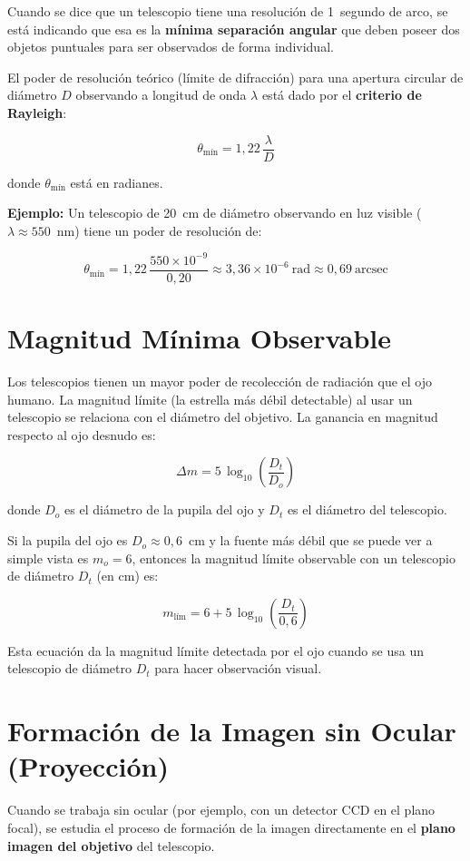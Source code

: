Cuando se dice que un telescopio tiene una resolución de 1~segundo de arco, se está indicando que esa es la \textbf{mínima separación angular} que deben poseer dos objetos puntuales para ser observados de forma individual.

El poder de resolución teórico (límite de difracción) para una apertura circular de diámetro $D$ observando a longitud de onda $\lambda$ está dado por el \textbf{criterio de Rayleigh}:

$$\theta_{\text{mín}} = 1{,}22\,\frac{\lambda}{D}$$

donde $\theta_{\text{mín}}$ está en radianes.

\textbf{Ejemplo:} Un telescopio de 20~cm de diámetro observando en luz visible ($\lambda \approx 550$~nm) tiene un poder de resolución de:

$$\theta_{\text{mín}} = 1{,}22\,\frac{550\times10^{-9}}{0{,}20} \approx 3{,}36\times10^{-6}~\text{rad} \approx 0{,}69~\text{arcsec}$$

\section{Magnitud Mínima Observable}

Los telescopios tienen un mayor poder de recolección de radiación que el ojo humano. La magnitud límite (la estrella más débil detectable) al usar un telescopio se relaciona con el diámetro del objetivo. La ganancia en magnitud respecto al ojo desnudo es:

$$\Delta m = 5\,\log_{10}\!\left(\frac{D_t}{D_o}\right)$$

donde $D_o$ es el diámetro de la pupila del ojo y $D_t$ es el diámetro del telescopio.

Si la pupila del ojo es $D_o \approx 0{,}6$~cm y la fuente más débil que se puede ver a simple vista es $m_o = 6$, entonces la magnitud límite observable con un telescopio de diámetro $D_t$ (en cm) es:

$$m_{\text{lím}} = 6 + 5\,\log_{10}\!\left(\frac{D_t}{0{,}6}\right)$$

Esta ecuación da la magnitud límite detectada por el ojo cuando se usa un telescopio de diámetro $D_t$ para hacer observación visual.

\section{Formación de la Imagen sin Ocular (Proyección)}

Cuando se trabaja sin ocular (por ejemplo, con un detector CCD en el plano focal), se estudia el proceso de formación de la imagen directamente en el \textbf{plano imagen del objetivo} del telescopio.

